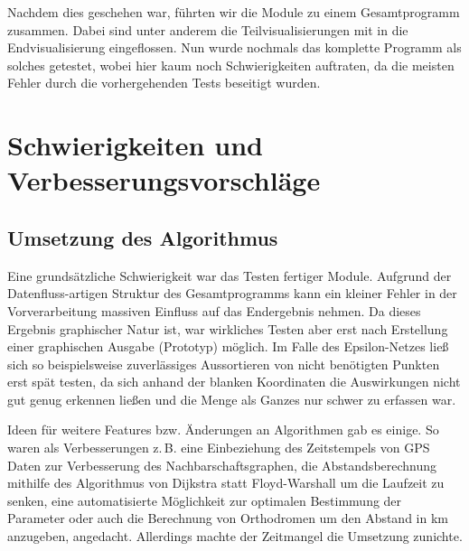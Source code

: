 \documentclass[parskip=half,
 fontsize=12pt, bibtotoc,
 titlepage, ngerman]
 {article}
\begin{document}
Nachdem dies geschehen war, führten wir die Module zu einem Gesamtprogramm zusammen. Dabei sind unter anderem die Teilvisualisierungen mit in die Endvisualisierung eingeflossen. Nun wurde nochmals das komplette Programm als solches getestet, wobei hier kaum noch Schwierigkeiten auftraten, da die meisten Fehler durch die vorhergehenden Tests beseitigt wurden.

\section{Schwierigkeiten und Verbesserungsvorschläge}

\subsection*{Umsetzung des Algorithmus}
Eine grundsätzliche Schwierigkeit war das Testen fertiger Module.
Aufgrund der Datenfluss-artigen Struktur des Gesamtprogramms kann
ein kleiner Fehler in der Vorverarbeitung massiven Einfluss
auf das Endergebnis nehmen. Da dieses Ergebnis graphischer Natur ist,
war wirkliches Testen aber erst nach Erstellung einer graphischen Ausgabe
(Prototyp) möglich. Im Falle des Epsilon-Netzes ließ sich so beispielsweise 
zuverlässiges Aussortieren von nicht benötigten Punkten erst spät testen,
da sich anhand der blanken Koordinaten die Auswirkungen nicht gut genug
erkennen ließen und die Menge als Ganzes nur schwer zu erfassen war.

Ideen für weitere Features bzw. Änderungen an Algorithmen gab es einige. So waren
als Verbesserungen z.\,B. eine Einbeziehung des Zeitstempels von GPS Daten
zur Verbesserung des Nachbarschaftsgraphen, die Abstandsberechnung mithilfe des
Algorithmus von Dijkstra statt Floyd-Warshall um die Laufzeit zu senken,
eine automatisierte Möglichkeit zur optimalen Bestimmung der Parameter oder
auch die Berechnung von Orthodromen um den Abstand in km anzugeben, angedacht. Allerdings machte der Zeitmangel die Umsetzung zunichte.
\end{document}
